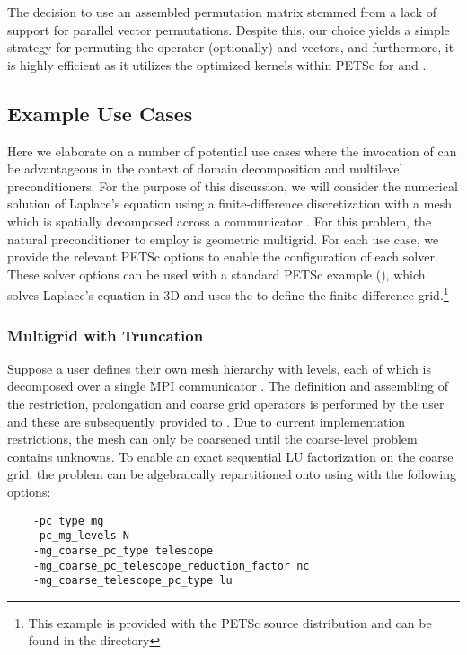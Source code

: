 \documentclass[]{siamart0216}
\begin{document}
\begin{itemize}
	The decision to use an assembled permutation matrix stemmed from a lack of support for parallel vector permutations.
	Despite this, our choice yields a simple strategy for permuting the operator (optionally) and vectors, and furthermore, it is highly 
	efficient as it utilizes the optimized kernels within PETSc for  and .
\end{itemize}


\subsection{Example Use Cases} \label{sec:usecases}
Here we elaborate on a number of potential use cases where the invocation of  
can be advantageous in the context of domain decomposition and multilevel preconditioners.
For the purpose of this discussion, we will consider the numerical solution of Laplace's equation 
using a finite-difference discretization with a mesh which is spatially decomposed 
across a communicator . 
For this problem, the natural preconditioner to employ is geometric multigrid. 
For each use case, we provide the relevant PETSc options to enable the configuration of each solver.
These solver options can be used with a standard PETSc example (), which solves 
Laplace's equation in 3D and uses the  to define the finite-difference grid.\footnote{
This example is provided with the PETSc source distribution and can be found  in the directory }
\subsubsection{Multigrid with Truncation} \label{sec:truncation} 
Suppose a user defines their own mesh hierarchy with  levels, each of which is decomposed over a single MPI communicator .
	The definition and assembling  of the restriction, prolongation and coarse grid operators is performed by the user
	and these are subsequently provided to .  
	Due to current implementation restrictions, the mesh can only be coarsened until the coarse-level problem 
	contains  unknowns. 
	To enable an exact sequential LU factorization on the coarse grid, the problem can be algebraically 
	repartitioned onto  using  with the following options:
\begin{tcolorbox}[colframe=red,colback=cornsilk,boxrule=0.5pt,arc=4pt,
      left=-6pt,right=6pt,top=6pt,bottom=6pt,boxsep=0pt]
	\begin{verbatim}
    -pc_type mg
    -pc_mg_levels N
    -mg_coarse_pc_type telescope
    -mg_coarse_pc_telescope_reduction_factor nc
    -mg_coarse_telescope_pc_type lu
	\end{verbatim}
\end{tcolorbox}	
\end{document}
